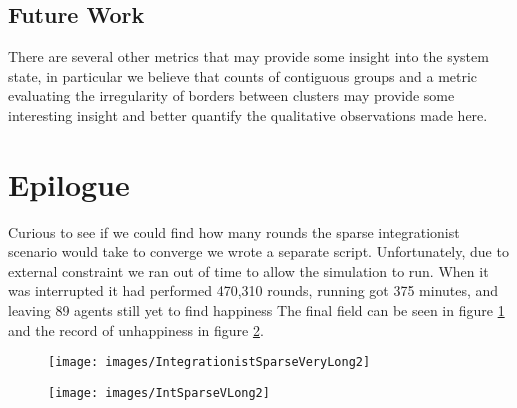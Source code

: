\documentclass[sigplan,nonacm]{acmart}
\begin{document}
\subsection{Future Work}

There are several other metrics that may provide some insight into the system state, in particular we believe that 
counts of contiguous groups and a metric evaluating the irregularity of borders between clusters may provide some interesting insight
and better quantify the qualitative observations made here.






\clearpage

\section{Epilogue}

Curious to see if we could find how many rounds the sparse integrationist scenario would take to converge
we wrote a separate script. Unfortunately, due to external constraint we ran out of time to allow the simulation to run.
When it was interrupted it had performed 470,310 rounds, running got 375 minutes, and leaving 89 agents still yet to find happiness
The final field can be seen in figure \ref{fig:integrationistsparseverylong2}
and the record of unhappiness in figure \ref{fig:intsparsevlong2}.

\begin{figure}
	\centering
	\texttt{[image: images/IntegrationistSparseVeryLong2]}
	\caption{}
	\label{fig:integrationistsparseverylong2}
\end{figure}
\begin{figure}
	\centering
	\texttt{[image: images/IntSparseVLong2]}
	\caption{}
	\label{fig:intsparsevlong2}
\end{figure}
\end{document}
